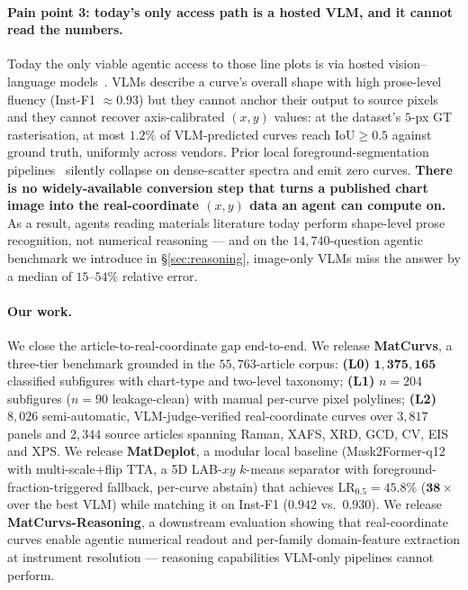 \documentclass{article}
\begin{document}
\paragraph{Pain point 3: today's only access path is a hosted VLM, and it cannot read the numbers.}
Today the only viable agentic access to those line plots is via
hosted vision--language models~\citep{gpt4,claude,gemini,qwenvl}.
VLMs describe a curve's overall shape with high prose-level
fluency (Inst-F1 ${\approx}0.93$) but they cannot anchor their
output to source pixels and they cannot recover axis-calibrated
$(x,y)$ values: at the dataset's $5$-px GT rasterisation, at most
$\mathbf{1.2\%}$ of VLM-predicted curves reach IoU${\ge}0.5$
against ground truth, uniformly across vendors. Prior local
foreground-segmentation pipelines~\citep{deeplabv3plus,unetplusplus,
resnest} silently collapse on dense-scatter spectra and emit zero
curves. \textbf{There is no widely-available conversion step that
turns a published chart image into the real-coordinate $(x,y)$
data an agent can compute on.} As a result, agents reading
materials literature today perform shape-level prose recognition,
not numerical reasoning --- and on the $14{,}740$-question agentic
benchmark we introduce in \S\ref{sec:reasoning}, image-only VLMs
miss the answer by a median of $15\text{--}54\%$ relative error.

\paragraph{Our work.}
We close the article-to-real-coordinate gap end-to-end. We release
\textbf{MatCurvs}, a three-tier benchmark grounded in the
$55{,}763$-article corpus: \textbf{(L0)} $\mathbf{1{,}375{,}165}$
classified subfigures with chart-type and two-level taxonomy;
\textbf{(L1)} $n{=}204$ subfigures ($n{=}90$ leakage-clean) with
manual per-curve pixel polylines; \textbf{(L2)} $8{,}026$
semi-automatic, VLM-judge-verified real-coordinate curves over
$3{,}817$ panels and $2{,}344$ source articles spanning Raman,
XAFS, XRD, GCD, CV, EIS and XPS. We release \textbf{MatDeplot}, a
modular local baseline (Mask2Former-q12~\citep{mask2former,mitb3}
with multi-scale${+}$flip TTA, a 5D LAB-$xy$ $k$-means separator
with foreground-fraction-triggered fallback, per-curve abstain) that
achieves $\mathrm{LR}_{0.5}{=}45.8\%$ ($\boldsymbol{38\times}$ over
the best VLM) while matching it on Inst-F1 ($0.942$ vs.\ $0.930$).
We release \textbf{MatCurvs-Reasoning}, a downstream evaluation
showing that real-coordinate curves enable agentic numerical readout
and per-family domain-feature extraction at instrument resolution
--- reasoning capabilities VLM-only pipelines cannot perform.
\end{document}
